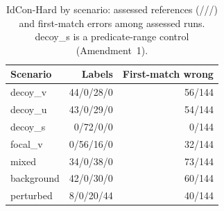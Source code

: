 \begin{table}[t]
\caption{IdCon-Hard by scenario: assessed references (\Sat/\Vio/\Unk/\Emp) and first-match errors among assessed runs. \textsf{decoy\_s} is a predicate-range control (Amendment~1).}
\label{tab:scenario}
\centering\footnotesize
\begin{tabular}{lrr}
\toprule
Scenario & Labels & First-match wrong\\
\midrule
\textsf{decoy\_v} & 44/0/28/0 & 56/144\\
\textsf{decoy\_u} & 43/0/29/0 & 54/144\\
\textsf{decoy\_s} & 0/72/0/0 & 0/144\\
\textsf{focal\_v} & 0/56/16/0 & 32/144\\
\textsf{mixed} & 34/0/38/0 & 73/144\\
\textsf{background} & 42/0/30/0 & 60/144\\
\textsf{perturbed} & 8/0/20/44 & 40/144\\
\bottomrule
\end{tabular}
\end{table}
